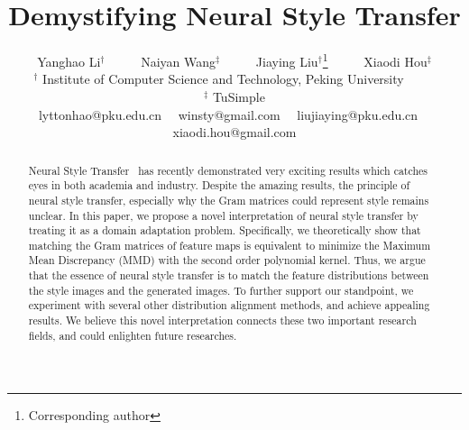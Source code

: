 \documentclass{article}
\begin{document}
\title{Demystifying Neural Style Transfer}

\author{Yanghao Li$^\dagger$~~~~~ Naiyan Wang$^\ddagger$~~~~~ Jiaying Liu$^\dagger$\thanks{Corresponding author}~~~~~ Xiaodi Hou$^\ddagger$\\
$^\dagger$ Institute of Computer Science and Technology, Peking University~~~~~\\
$^\ddagger$ TuSimple\\
{ lyttonhao@pku.edu.cn}~~{ winsty@gmail.com}~~
{ liujiaying@pku.edu.cn}~~
{ xiaodi.hou@gmail.com}
}

\maketitle
{}

\graphicspath{{figures/}}

\begin{abstract}

Neural Style Transfer~\cite{neuralart} has recently demonstrated very exciting results which catches eyes in both academia and industry. Despite the amazing results, the principle of neural style transfer, especially why the Gram matrices could represent style remains unclear. In this paper, we propose a novel interpretation of neural style transfer by treating it as a domain adaptation problem. Specifically, we theoretically show that matching the Gram matrices of feature maps is equivalent to minimize the Maximum Mean Discrepancy (MMD) with the second order polynomial kernel. Thus, we argue that the essence of neural style transfer is to match the feature distributions between the style images and the generated images. To further support our standpoint, we experiment with several other distribution alignment methods, and achieve appealing results. We believe this novel interpretation connects these two important research fields, and could enlighten future researches.

\end{abstract}
\end{document}
